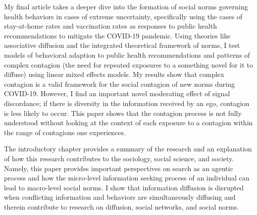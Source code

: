 My final article takes a deeper dive into the formation of social norms
governing health behaviors in cases of extreme uncertainty, specifically using the cases of
 stay-at-home rates and vaccination rates as responses to public health
recommendations to mitigate the COVID-19 pandemic. Using theories like associative diffusion
and the integrated theoretical framework of norms, I test models of behavioral adaption
to public health recommendations and patterns of complex contagion (the need for
repeated exposures to a something novel for it to diffuse) using linear
mixed effects models. My results show that complex contagion is a valid 
framework for the social contagion of new norms during COVID-19. 
However, I find an important novel moderating effect of signal discordance; 
if there is diversity in the information received by an ego, 
contagion is less likely to occur. This paper shows that
the contagion process is not fully understood without looking at the context
of each exposure to a contagion within the range of contagions one experiences. 

The introductory chapter provides a summary of the research and an explanation of how this
research contributes to the sociology, social science, and society. Namely, 
this paper provides important perspectives on search as an agentic process
and how the micro-level information seeking process of an individual can
lead to macro-level social norms. I show that information diffusion
is disrupted when conflicting information and behaviors are simultaneously
diffusing and therein contribute to research on diffusion, social networks,
and social norms. 


